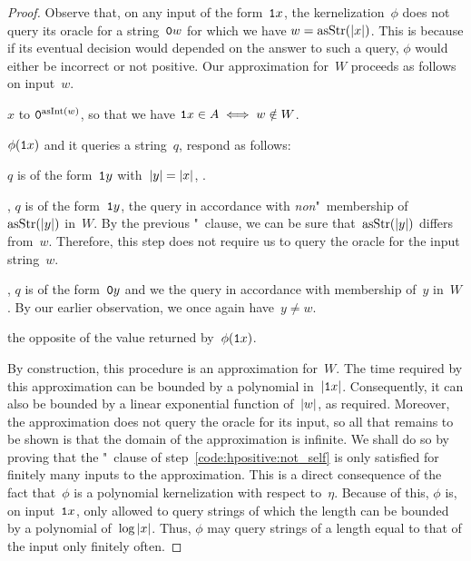 \begin{proof}
  Observe that, on any input of the form~$\textnormal{\texttt{1}}x$, the kernelization~$\phi$ does not query its oracle for a string~$\textnormal{\texttt{0}}w$ for which we have $w = \operatorname{asStr}({\lvert x\rvert})$.
  This is because if its eventual decision would depended on the answer to such a query, $\phi$ would either be incorrect or not positive.
  Our approximation for~$W$ proceeds as follows on input~$w$.
  \begin{codelisting}
  \item
     $x$ to $\bits{0}^{\asNat(w)}$, so that we have $\bits{1}x \in A \iff w \notin W$.
  \item
     $\phi(\bits{1}x)$ and  it queries a string~$q$, respond as follows:
    \begin{codelisting}
    \item\label{code:hpositive:not_self}%
       $q$ is of the form~$\bits{1}y$ with~$\length{y} = \length{x}$,  .
    \item
      ,  $q$ is of the form~$\bits{1}y$,  the query in accordance with \emph{non}"~membership of~$\asStr(\length{y})$ in~$W$.
      By the previous "~clause, we can be sure that~$\asStr(\length{y})$ differs from~$w$.
      Therefore, this step does not require us to query the oracle for the input string~$w$.
    \item
      , $q$ is of the form~$\bits{0}y$ and we  the query in accordance with membership of~$y$ in~$W$.
      By our earlier observation, we once again have~$y \neq w$.
    \end{codelisting}
    \item
       the opposite of the value returned by~$\phi(\textnormal{\texttt{1}}x)$.
  \end{codelisting}
  By construction, this procedure is an approximation for~$W$.
  The time required by this approximation can be bounded by a polynomial in~${\lvert\textnormal{\texttt{1}}x\rvert}$.
  Consequently, it can also be bounded by a linear exponential function of~${\lvert w\rvert}$, as required.
  Moreover, the approximation does not query the oracle for its input, so all that remains to be shown is that the domain of the approximation is infinite.
  We shall do so by proving that the "~clause of step~\ref{code:hpositive:not_self} is only satisfied for finitely many inputs to the approximation.
  This is a direct consequence of the fact that~$\phi$ is a polynomial kernelization with respect to~$\eta$.
  Because of this, $\phi$ is, on input~$\textnormal{\texttt{1}}x$, only allowed to query strings of which the length can be bounded by a polynomial of~$\log{\lvert x\rvert}$.
  Thus, $\phi$ may query strings of a length equal to that of the input only finitely often.
\end{proof}

